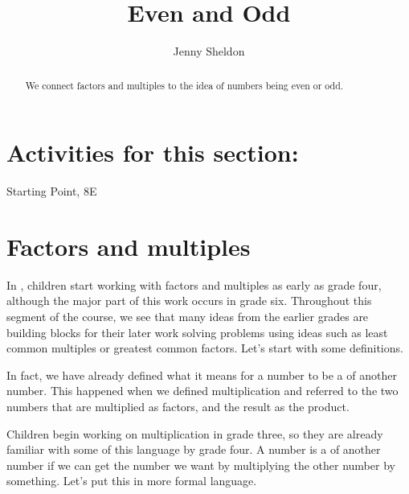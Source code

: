 \documentclass{ximera}
\title{Even and Odd}
\author{Jenny Sheldon}
\begin{document}
\begin{abstract}
We connect factors and multiples to the idea of numbers being even or odd.
\end{abstract}
\maketitle

\section{Activities for this section:} Starting Point, 8E

\section{Factors and multiples}

In , children start working with factors and multiples as early as grade four, although the major part of this work occurs in grade six. Throughout this segment of the course, we see that many ideas from the earlier grades are building blocks for their later work solving problems using ideas such as least common multiples or greatest common factors. Let's start with some definitions. 

In fact, we have already defined what it means for a number to be a  of another number. This happened when we defined multiplication and referred to the two numbers that are multiplied as factors, and the result as the product.
\begin{image}
\end{image}
Children begin working on multiplication in grade three, so they are already familiar with some of this language by grade four. A number is a  of another number if we can get the number we want by multiplying the other number by something. Let's put this in more formal language.
\end{document}
